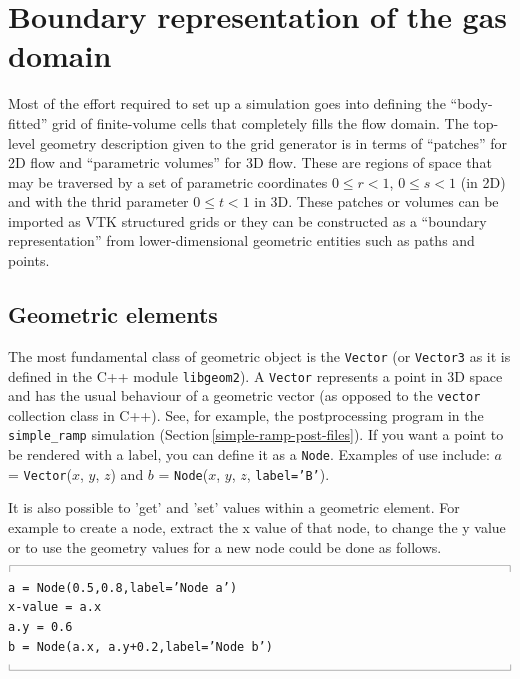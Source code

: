 \documentclass[12pt,a4paper,twoside]{article}
\newcommand{\topbar}{\ensuremath{
    \rule{0.1mm}{2.0mm} \rule[2.0mm]{159.5mm}{0.1mm} \rule{0.1mm}{2.0mm}
}}
\newcommand{\bottombar}{\ensuremath{
    \rule{0.1mm}{2.0mm} \rule{159.5mm}{0.1mm} \rule{0.1mm}{2.0mm}
}}
\begin{document}
\section{Boundary representation of the gas domain}
%
Most of the effort required to set up a simulation goes into defining the
``body-fitted'' grid of finite-volume cells that completely fills the flow
domain.
The top-level geometry description given to the grid generator is in terms of
``patches'' for 2D flow and ``parametric volumes'' for 3D flow.
These are regions of space that may be traversed by
a set of parametric coordinates $0 \le r < 1$, $0 \le s < 1$ (in 2D) and 
with the thrid parameter $0 \le t < 1$ in 3D.
These patches or volumes can be imported as VTK structured grids or they can be
constructed as a ``boundary representation'' from lower-dimensional 
geometric entities such as paths and points.

\subsection{Geometric elements}
%
The most fundamental class of geometric object is the \texttt{Vector} (or
\texttt{Vector3} as it is defined in the C++ module \texttt{libgeom2}).
A \texttt{Vector} represents a point in 3D space and has the usual behaviour 
of a geometric vector (as opposed to the \texttt{vector} collection class in
C++).
See, for example, the postprocessing program in the \texttt{simple\_ramp}
simulation (Section\,\ref{simple-ramp-post-files}).
If you want a point to be rendered with a label, you can define it as a
\texttt{Node}.
Examples of use include: $a$ = \texttt{Vector}($x$, $y$, $z$) and
$b$ = \texttt{Node}($x$, $y$, $z$, \texttt{label='B'}).

\medskip
It is also possible to 'get' and 'set' values within a geometric element. For example to
create a node, extract the x value of that node, to change the y value or to use
the geometry values for a new node could be done as follows.\\
\topbar\\
\texttt{a = Node(0.5,0.8,label='Node a')}\\
\texttt{x-value = a.x}\\
\texttt{a.y = 0.6}\\
\texttt{b = Node(a.x, a.y+0.2,label='Node b')}\\
\bottombar\\
\end{document}
